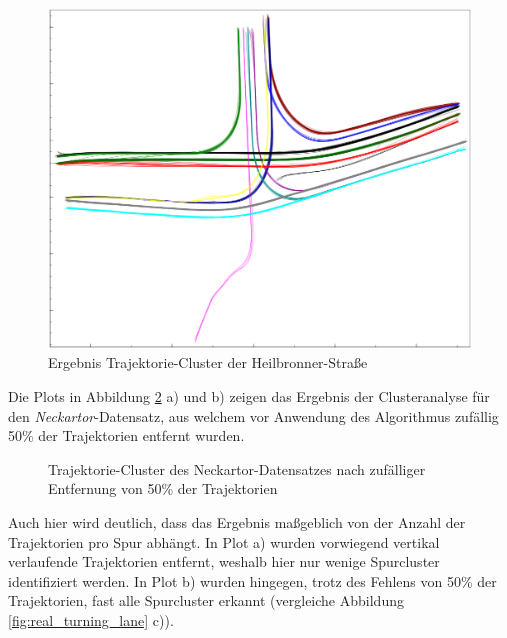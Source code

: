 \begin{figure}[H]
    \centering
    \includegraphics[width=0.35\linewidth]{resources/img/results/Heilbronner/filteredClusters_Heilbronner}
    \caption{Ergebnis Trajektorie-Cluster der Heilbronner-Straße}
    \label{fig:results_clusters_heilbronner}
\end{figure}

Die Plots in Abbildung \ref{fig:results_clusters_neckartor} a) und b) zeigen das Ergebnis der Clusteranalyse für
den \textit{Neckartor}-Datensatz, aus welchem vor Anwendung des Algorithmus zufällig 50\% der Trajektorien entfernt wurden.

\begin{figure}[H]
    \centering
    \qquad \qquad
    \caption[Ergebnisse Test Clusteranalyse auf Neckartor Datensatz]
            {Trajektorie-Cluster des Neckartor-Datensatzes nach zufälliger Entfernung von 50\% der Trajektorien}
    \label{fig:results_clusters_neckartor}
\end{figure}

Auch hier wird deutlich, dass das Ergebnis maßgeblich von der Anzahl der Trajektorien pro Spur abhängt.
In Plot a) wurden vorwiegend vertikal verlaufende Trajektorien entfernt, weshalb hier nur wenige Spurcluster identifiziert werden.
In Plot b) wurden hingegen, trotz des Fehlens von 50\% der Trajektorien, fast alle Spurcluster erkannt
(vergleiche Abbildung \ref{fig:real_turning_lane} c)).

